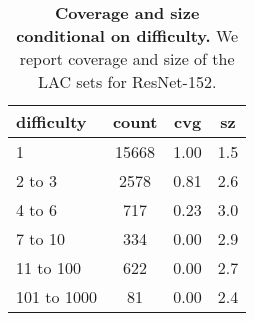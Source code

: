 \begin{table}[t]
\centering
\tiny
\begin{tabular}{lccc} 
\toprule
difficulty & count & cvg & sz \\ 
\midrule
1      & 15668 & 1.00 & 1.5  \\ 
2 to 3      & 2578 & 0.81 & 2.6  \\ 
4 to 6      & 717 & 0.23 & 3.0  \\ 
7 to 10      & 334 & 0.00 & 2.9  \\ 
11 to 100      & 622 & 0.00 & 2.7  \\ 
101 to 1000      & 81 & 0.00 & 2.4  \\ 
\bottomrule
\end{tabular}
\caption{\textbf{Coverage and size conditional on difficulty.} We report coverage and size of the LAC sets for ResNet-152.}
\label{table:lei-wasserman-difficulty}
\end{table}

